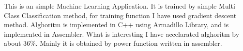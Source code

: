 This is an simple Machine Learning Application. It is trained by simple Multi Class Classification method, for training function I have used gradient descent method. Alghoritm is implemented in C++ using Armadillo Library, and is implemented in Assembler. What is interesting I have accelarated alghoritm by about 36\%. Mainly it is obtained by power function written in assembler. 